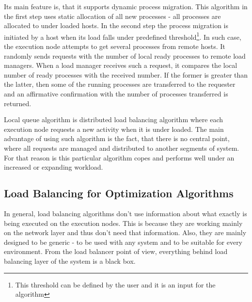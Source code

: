 Its main feature is, that it supports dynamic process migration.
This algorithm in the first step uses static allocation of all new processes - all processes are allocated to under loaded hosts.
In the second step the process migration is initiated by a host when its load falls under predefined threshold\footnote{
This threshold can be defined by the user and it is an input for the algorithm}.
In such case, the execution node attempts to get several processes from remote hosts.
It randomly sends requests with the number of local ready processes to remote load managers.
When a load manager receives such a request, it compares the local number of ready processes with the received number.
If the former is greater than the latter, then some of the running processes are transferred to the requester
and an affirmative confirmation with the number of processes transferred is returned.\cite{sharma2008performance}

Local queue algorithm is distributed load balancing algorithm where each execution node requests a new activity when it is under loaded.
The main advantage of using such algorithm is the fact, that there is no central point,
where all requests are managed and distributed to another segments of system.
For that reason is this particular algorithm copes and performs well under an increased or expanding workload.




\subsection{Load Balancing for Optimization Algorithms}\label{subsec:load-balancing-for-optimization-algorithms}
In general, load balancing algorithms don't use information about what exactly is being executed on the execution nodes.
This is because they are working mainly on the network layer and thus don't need that information.
Also, they are mainly designed to be generic - to be used with any system and to be suitable for every environment.
From the load balancer point of view, everything behind load balancing layer of the system is a black box.

